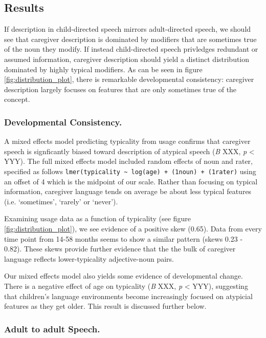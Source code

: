 \documentclass[10pt, letterpaper]{article}
\begin{document}
\hypertarget{results}{%
\subsection{Results}\label{results}}

If description in child-directed speech mirrors adult-directed speech,
we should see that caregiver description is dominated by modifiers that
are sometimes true of the noun they modify. If instead child-directed
speech privledges redundant or assumed information, caregiver
description should yield a distinct distribution dominated by highly
typical modifiers. As can be seen in figure \ref{fig:distribution_plot},
there is remarkable developmental consistency: caregiver description
largely focuses on features that are only sometimes true of the concept.

\hypertarget{developmental-consistency.}{%
\subsubsection{Developmental
Consistency.}\label{developmental-consistency.}}

A mixed effects model predicting typicality from usage confirms that
caregiver speech is signficantly biased toward description of atypical
speech (\emph{B} XXX, \emph{p} \textless{} YYY). The full mixed effects
model included random effects of noun and rater, specified as follows
\texttt{lmer(typicality\ \textasciitilde{}\ log(age)\ +\ (1\textbar{}noun)\ +\ (1\textbar{}rater)}
using an offset of 4 which is the midpoint of our scale. Rather than
focusing on typical information, caregiver language tends on average be
about less typical features (i.e. `sometimes', `rarely' or `never').

Examining usage data as a function of typicality (see figure
\ref{fig:distribution_plot}), we see evidence of a positive skew (0.65).
Data from every time point from 14-58 months seems to show a similar
pattern (skews 0.23 - 0.82). These skews provide further evidence that
the the bulk of caregiver language reflects lower-typicality
adjective-noun pairs.

Our mixed effects model also yields some evidence of developmental
change. There is a negative effect of age on typicality (\emph{B} XXX,
\emph{p} \textless{} YYY), suggesting that children's language
environments become increasingly focused on atypicial features as they
get older. This result is discussed further below.

\hypertarget{adult-to-adult-speech.}{%
\subsubsection{Adult to adult Speech.}\label{adult-to-adult-speech.}}
\end{document}
